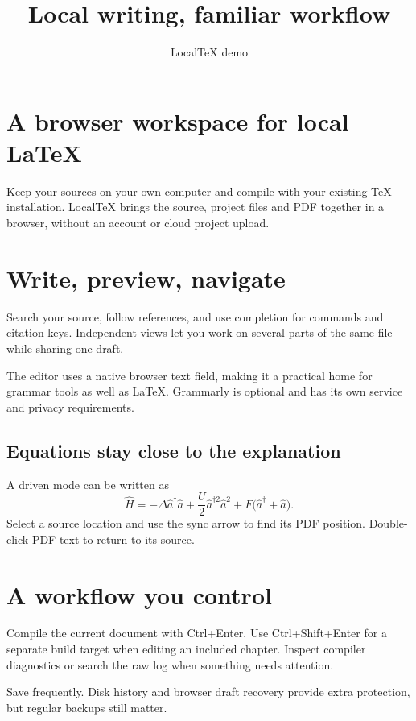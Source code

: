 \documentclass[11pt]{article}
\title{Local writing, familiar workflow}
\author{LocalTeX demo}
\date{}
\begin{document}
\maketitle

\section{A browser workspace for local LaTeX}
Keep your sources on your own computer and compile with your
existing TeX installation. LocalTeX brings the source, project
files and PDF together in a browser, without an account or
cloud project upload.

\section{Write, preview, navigate}
Search your source, follow references, and use completion for
commands and citation keys. Independent views let you work on
several parts of the same file while sharing one draft.

The editor uses a native browser text field, making it a
practical home for grammar tools as well as LaTeX. Grammarly
is optional and has its own service and privacy requirements.

\subsection{Equations stay close to the explanation}
A driven mode can be written as
\begin{equation}
  \hat{H} = -\Delta \hat{a}^{\dagger}\hat{a}
  + \frac{U}{2}\hat{a}^{\dagger 2}\hat{a}^{2}
  + F\bigl(\hat{a}^{\dagger}+\hat{a}\bigr).
  \label{eq:mode}
\end{equation}
Select a source location and use the sync arrow to find its
PDF position. Double-click PDF text to return to its source.



\section{A workflow you control}
Compile the current document with Ctrl+Enter. Use
Ctrl+Shift+Enter for a separate build target when editing
an included chapter. Inspect compiler diagnostics or search
the raw log when something needs attention.

Save frequently. Disk history and browser draft recovery
provide extra protection, but regular backups still matter.
\end{document}
